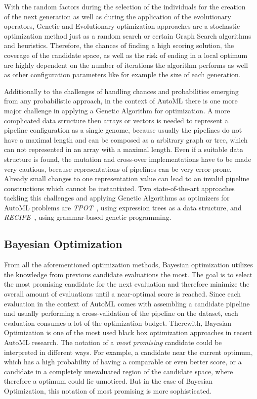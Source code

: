 With the random factors during the selection of the individuals for the creation of the next generation as well as during the application of the evolutionary operators, Genetic and Evolutionary optimization approaches are a stochastic optimization method just as a random search or certain Graph Search algorithms and heuristics.
Therefore, the chances of finding a high scoring solution, the coverage of the candidate space, as well as the risk of ending in a local optimum are highly dependent on the number of iterations the algorithm performs as well as other configuration parameters like for example the size of each generation.

Additionally to the challenges of handling chances and probabilities emerging from any probabilistic approach, in the context of AutoML there is one more major challenge in applying a Genetic Algorithm for optimization.
A more complicated data structure then arrays or vectors is needed to represent a pipeline configuration as a single genome, because usually the pipelines do not have a maximal length and can be composed as a arbitrary graph or tree, which can not represented in an array with a maximal length.
Even if a suitable data structure is found, the mutation and cross-over implementations have to be made very cautious, because representations of pipelines can be very error-prone.
Already small changes to one representation value can lead to an invalid pipeline constructions which cannot be instantiated.\newline
Two state-of-the-art approaches tackling this challenges and applying Genetic Algorithms as optimizers for AutoML problems are \textit{TPOT}~\cite{Olson-Tpot}, using expression trees as a data structure, and \textit{RECIPE}~\cite{Guimar-Recipe}, using grammar-based genetic programming.

\subsection{Bayesian Optimization}
\label{sec:theory:optimization:bayesian}
From all the aforementioned optimization methods, Bayesian optimization utilizes the knowledge from previous candidate evaluations the most.
The goal is to select the most promising candidate for the next evaluation and therefore minimize the overall amount of evaluations until a near-optimal score is reached.
Since each evaluation in the context of AutoML comes with assembling a candidate pipeline and usually performing a cross-validation of the pipeline on the dataset, each evaluation consumes a lot of the optimization budget.
Therewith, Bayesian Optimization is one of the most used black box optimization approaches in recent AutoML research.\newline
The notation of a \textit{most promising} candidate could be interpreted in different ways.
For example, a candidate near the current optimum, which has a high probability of having a comparable or even better score, or a candidate in a completely unevaluated region of the candidate space, where therefore a optimum could lie unnoticed.
But in the case of Bayesian Optimization, this notation of most promising is more sophisticated.


